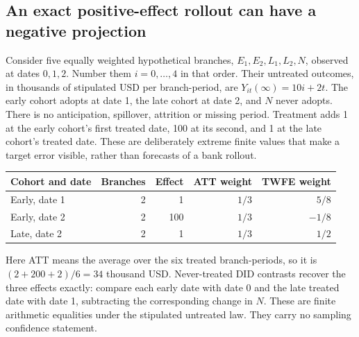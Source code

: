 \subsection{An exact positive-effect rollout can have a negative projection}
\label{exec18:gp-panel-example}

Consider five equally weighted hypothetical branches, \(E_1,E_2,L_1,L_2,N\),
observed at dates \(0,1,2\). Number them \(i=0,\ldots,4\) in that order.
Their untreated outcomes, in thousands of stipulated USD per branch-period,
are \(Y_{it}(\infty)=10i+2t\). The early cohort adopts at date 1, the late
cohort at date 2, and \(N\) never adopts. There is no anticipation, spillover,
attrition or missing period. Treatment adds 1 at the early cohort's first
treated date, 100 at its second, and 1 at the late cohort's treated date.
These are deliberately extreme finite values that make a target error
visible, rather than forecasts of a bank rollout.
\citep{exec18_gp_panel_reference}

\begin{center}
\begin{tabular}{lrrrr}
\hline
Cohort and date & Branches & Effect & ATT weight & TWFE weight\\
\hline
Early, date 1 & 2 & 1 & \(1/3\) & \(5/8\)\\
Early, date 2 & 2 & 100 & \(1/3\) & \(-1/8\)\\
Late, date 2 & 2 & 1 & \(1/3\) & \(1/2\)\\
\hline
\end{tabular}
\end{center}
Here ATT means the average over the six treated branch-periods, so it is
\((2+200+2)/6=34\) thousand USD. Never-treated DID contrasts recover the
three effects exactly: compare each early date with date 0 and the late
treated date with date 1, subtracting the corresponding change in \(N\).
These are finite arithmetic equalities under the stipulated untreated law.
They carry no sampling confidence statement.
\citep{exec18_gp_panel_reference}


